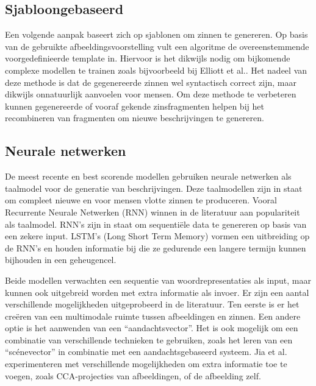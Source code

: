 \subsection{Sjabloongebaseerd}
Een volgende aanpak baseert zich op sjablonen om zinnen te genereren. Op basis van de gebruikte afbeeldingsvoorstelling vult een algoritme de overeenstemmende voorgedefinieerde template in\cite{Yang2011}. Hiervoor is het dikwijls nodig om bijkomende complexe modellen te trainen zoals bijvoorbeeld bij Elliott et al.\cite{Elliott2013}. Het nadeel van deze methode is dat de gegenereerde zinnen wel syntactisch correct zijn, maar dikwijls onnatuurlijk aanvoelen voor mensen. Om deze methode te verbeteren kunnen gegenereerde of vooraf gekende zinsfragmenten helpen bij het recombineren van fragmenten om nieuwe beschrijvingen te genereren\cite{Mitchell2012,Kuznetsova2012}. 

\subsection{Neurale netwerken}
De meest recente en best scorende modellen gebruiken neurale netwerken als taalmodel voor de generatie van beschrijvingen. Deze taalmodellen zijn in staat om compleet nieuwe en voor mensen vlotte zinnen te produceren. Vooral Recurrente Neurale Netwerken (RNN)\cite{Mikolov2010} winnen in de literatuur aan populariteit als taalmodel. RNN's zijn in staat om sequenti\"ele data te genereren op basis van een zekere input. LSTM's (Long Short Term Memory)\cite{SeppHochreiter1997} vormen een uitbreiding op de RNN's en houden informatie bij die ze gedurende een langere termijn kunnen bijhouden in een geheugencel. 

Beide modellen verwachten een sequentie van woordrepresentaties als input, maar kunnen ook uitgebreid worden met extra informatie als invoer. Er zijn een aantal verschillende mogelijkheden uitgeprobeerd in de literatuur. Ten eerste is er het cre\"eren van een multimodale ruimte tussen afbeeldingen en zinnen\cite{Kiros2014,Socher2014}. Een andere optie is het aanwenden van een ``aandachtsvector''\cite{Xu2015}. Het is ook mogelijk om een combinatie van verschillende technieken te gebruiken, zoals het leren van een ``sc\'enevector'' in combinatie met een aandachtsgebaseerd systeem\cite{Jin2015}. Jia et al. experimenteren met verschillende mogelijkheden om extra informatie toe te voegen, zoals CCA-projecties van afbeeldingen, of de afbeelding zelf\cite{Fernando2015}.

